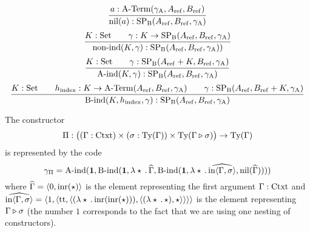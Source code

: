 \documentclass{article}
\begin{document}
\[
\infer{\nilB(a) : \SPB(\Aref, \Bref, \gammaA)}{a : \Aterm(\gammaA, \Aref, \Bref)}
\]
%
%
\[
\infer{\nonindB(K, \gamma) : \SPB(\Aref, \Bref, \gammaA))}{K : \Set & \quad \gamma : K \to \SPB(\Aref, \Bref, \gammaA)}
\]
%
%
\[
\infer{\AindB(K, \gamma) : \SPB(\Aref, \Bref, \gammaA)}{K : \Set & \quad \gamma : \SPB(\Aref + K, \Bref, \gammaA)}
\]
%
%
\[
\infer{\BindB(K, \hindex, \gamma) : \SPB(\Aref, \Bref, \gammaA)}{K : \Set & \quad \hindex : K \to \Aterm(\Aref, \Bref, \gammaA) & \quad \gamma : \SPB(\Aref, \Bref + K, \gammaA)}
\]
%
%
\begin{example}
  The constructor
  \[
  \Pi : \big((\Gamma : \text{Ctxt}) \times (\sigma : \text{Ty}(\Gamma)) \times \text{Ty}(\Gamma \triangleright \sigma)\big)\to \text{Ty}(\Gamma)
  \]
  is represented by the code
  \[
  \gamma_{\Pi} = \text{A-ind}(\mathbf{1},
                  \text{B-ind}(\mathbf{1}, \lambda \star\,.\,\widehat{\Gamma}, 
                    \text{B-ind}(\mathbf{1}, \lambda \star\,.\,\widehat{\text{in}\langle \Gamma , \sigma\rangle},
                      \text{nil}(\widehat{\Gamma}))))
  \]
  where $\widehat{\Gamma} = \langle 0 , \text{inr}(\star)\rangle$ is the element
  representing the first argument $\Gamma : \text{Ctxt}$ and
  $\widehat{\text{in}\langle \Gamma , \sigma\rangle} =
  \langle 1 , \langle \text{tt} , \langle (\lambda
        \star\,.\,\text{inr}(\text{inr}(\star))) , \langle (\lambda
          \star\,.\,\star) , \star\rangle\rangle\rangle\rangle$ is the element
  representing $\Gamma \triangleright \sigma$ (the number $1$ corresponds
  to the fact that we are using one nesting of constructors).
\blackqed
\end{example}
\end{document}
